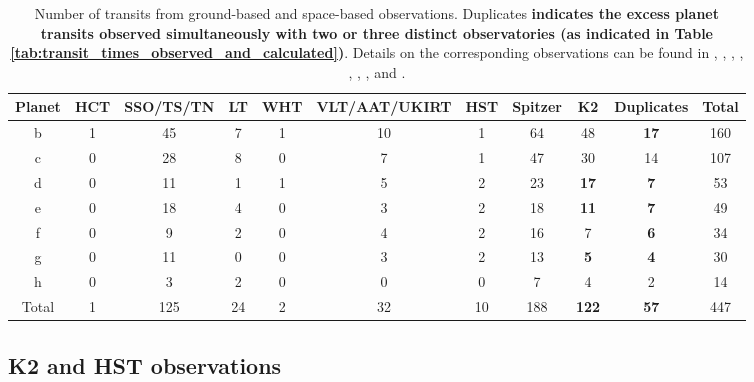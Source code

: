 \documentclass[twocolumn]{aastex63}
\begin{document}
\begin{table}
    \centering
    \begin{tabular}{c c c c c c c c c c c}
        \hline
        Planet & HCT & SSO/TS/TN & LT & WHT & VLT/AAT/UKIRT & HST & Spitzer & K2  & Duplicates & Total \\
        \hline
        b      & 1   & 45    & 7   & 1   & 10       & 1   & 64      & 48   & \textbf{17}        & 160   \\
        c      & 0   & 28    & 8   & 0   & 7        & 1   & 47      & 30   & 14        & 107   \\
        d      & 0   & 11    & 1   & 1   & 5        & 2   & 23      & \textbf{17}   & \textbf{7}         & 53    \\
        e      & 0   & 18    & 4   & 0   & 3        & 2   & 18      & \textbf{11}   & \textbf{7}         & 49    \\
        f      & 0   & 9     & 2   & 0   & 4        & 2   & 16      & 7    & \textbf{6}         & 34    \\
        g      & 0   & 11    & 0   & 0   & 3        & 2   & 13      & \textbf{5}    & \textbf{4}         & 30    \\
        h      & 0   & 3     & 2   & 0   & 0        & 0   & 7       & 4    & 2         & 14    \\
        \hline
        Total  & 1   & 125   & 24  & 2   & 32       & 10  & 188     & \textbf{122}  & \textbf{57}        & 447   \\
        \hline
    \end{tabular}
    \caption{Number of transits from ground-based and space-based observations. Duplicates \textbf{indicates the excess planet transits observed simultaneously with two or three distinct observatories (as indicated in Table \ref{tab:transit_times_observed_and_calculated})}. Details on the corresponding observations can be found in \citet{Gillon2016}, \citet{Gillon2017}, \citet{Grimm2018}, \citet{deWit2016,deWit2018}, \citet{Delrez2018a}, \citet{Ducrot2018}, \citet{Burdanov2019}, and \citet{Ducrot2020}.}
    \label{tab:transit_time_list}
\end{table}

\subsection{K2 and HST observations}

\end{document}

